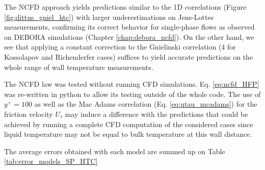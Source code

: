 \npar
The NCFD approach yields predictions similar to the 1D correlations (Figure \ref{fig:dittus_gniel_htc}) with larger underestimations on Jens-Lottes measurements, confirming its correct behavior for single-phase flows as observed on DEBORA simulations (Chapter \ref{chap:debora_ncfd}). On the other hand, we see that applying a constant correction to the Gnielinski correlation (4 for Kossolapov and Richenderfer cases) suffices to yield accurate predictions on the whole range of wall temperature measurements. 

\begin{remark*}{}
The NCFD law was tested without running CFD simulations. Eq. \ref{eq:ncfd_HFP} was re-written in python to allow its testing outside of the whole code. The use of $y^{+}=100$ as well as the Mac Adams correlation (Eq. \ref{eq:utau_mcadams}) for the friction velocity $U_{\tau}$ may induce a difference with the predictions that could be achieved by running a complete CFD computation of the considered cases since liquid temperature may not be equal to bulk temperature at this wall distance. 
\end{remark*}

\npar
The average errors obtained with each model are summed up on Table \ref{tab:error_models_SP_HTC}

\begin{table}[h!]


\noindent{}
\caption{Average errors achieved by the considered models on each data sets.}
\label{tab:error_models_SP_HTC}
\end{table}


